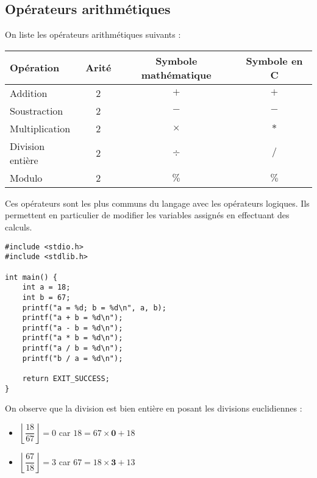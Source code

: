 \documentclass[../../../main.tex]{subfiles}
\begin{document}
\subsection{Opérateurs arithmétiques}
On liste les opérateurs arithmétiques suivants :
\begin{center}
\begin{tabular}{l|c|c|c}
Opération & Arité & Symbole mathématique & Symbole en C \\
\hline
Addition & 2 & $+$ & $+$ \\
Soustraction & 2 & $-$ & $-$ \\
Multiplication & 2 & $\times$ & $*$ \\
Division entière & 2 & $\div$ & $/$ \\
Modulo & 2 & $\%$ & $\%$
\end{tabular}
\end{center}
Ces opérateurs sont les plus communs du langage avec les opérateurs logiques. Ils permettent en particulier de modifier les variables assignés en effectuant des calculs.
\begin{verbatim}
#include <stdio.h>
#include <stdlib.h>

int main() {
	int a = 18;
	int b = 67;
	printf("a = %d; b = %d\n", a, b);
	printf("a + b = %d\n");
	printf("a - b = %d\n");
	printf("a * b = %d\n");
	printf("a / b = %d\n");
	printf("b / a = %d\n");

	return EXIT_SUCCESS;
}
\end{verbatim}
On observe que la division est bien entière en posant les divisions euclidiennes :
\begin{itemize}
	\item $\left\lfloor{\dfrac{18}{67}}\right\rfloor = 0$ car $18 = 67\times{\textbf{0}} + 18$
	\item $\left\lfloor{\dfrac{67}{18}}\right\rfloor = 3$ car $67 = 18\times{\textbf{3}} + 13$
\end{itemize}
%  
\end{document}
